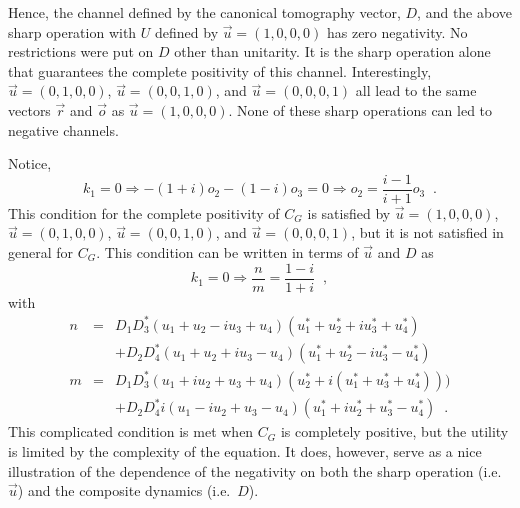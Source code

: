 Hence, the channel defined by the canonical tomography vector, $D$, and the above sharp operation with $U$ defined by $\vec{u}=(1,0,0,0)$ has zero negativity.  No restrictions were put on $D$ other than unitarity.  It is the sharp operation alone that guarantees the complete positivity of this channel.  Interestingly, $\vec{u}=(0,1,0,0)$, $\vec{u}=(0,0,1,0)$, and $\vec{u}=(0,0,0,1)$ all lead to the same vectors $\vec{r}$ and $\vec{o}$ as $\vec{u}=(1,0,0,0)$.  None of these sharp operations can led to negative channels.

Notice,
$$
k_1=0\Rightarrow -(1+i)o_2-(1-i)o_3 = 0 \Rightarrow o_2 = \frac{i-1}{i+1} o_3\;\;.
$$
This condition for the complete positivity of $C_G$ is satisfied by $\vec{u}=(1,0,0,0)$, $\vec{u}=(0,1,0,0)$, $\vec{u}=(0,0,1,0)$, and $\vec{u}=(0,0,0,1)$, but it is not satisfied in general for $C_G$.  This condition can be written in terms of $\vec{u}$ and $D$ as
$$
k_1=0\Rightarrow \frac{n}{m} = \frac{1-i}{1+i}\;\;,
$$
with 
\begin{eqnarray*}
n &=& D_1 D_3^* \left(u_1 + u_2 - i u_3 + u_4\right) \left(u_1^* + u_2^* + i u_3^* + u_4^*\right)\\
& &+D_2D_4^* \left(u_1 + u_2 + i u_3 - u_4\right) \left(u_1^* + u_2^* - i u_3^* -u_4^*\right)\\
m &=& D_1 D_3^* \left(u_1 + i u_2 + u_3 + u_4\right) \left(u_2^* + i (u_1^* + u_3^* + u_4^*)\right))\\
& & +D_2D_4^*i\left(u_1 - i u_2 + u_3 - u_4\right) \left(u_1^* + i u_2^* + u_3^* -u_4^*\right) \;\;.
\end{eqnarray*}
This complicated condition is met when $C_G$ is completely positive, but the utility is limited by the complexity of the equation.  It does, however, serve as a nice illustration of the dependence of the negativity on both the sharp operation (i.e.\ $\vec{u}$) and the composite dynamics (i.e.\ $D$).  

